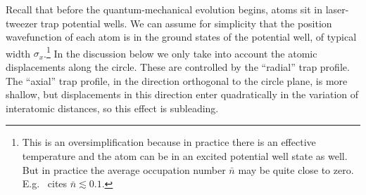 \documentclass[a4paper,12pt]{article}
\theoremstyle{remark}
\theoremstyle{theorem}
\begin{document}
Recall that before the quantum-mechanical evolution begins, atoms sit in laser-tweezer trap potential wells. We can assume for simplicity that the position wavefunction of each atom is in the ground states of the potential well, of typical width $\sigma_x$.\footnote{This is an oversimplification because in practice there is an effective temperature and the atom can be in an excited potential well state as well. But in practice the average occupation number $\bar n$ may be quite close to zero. E.g.~\cite{Fang:2024uyf} cites $\bar n\lesssim 0.1$.} In the discussion below we only take into account the atomic displacements along the circle. These are controlled by the ``radial'' trap profile. The ``axial'' trap profile, in the direction orthogonal to the circle plane, is more shallow, but displacements in this direction enter quadratically in the variation of interatomic distances, so this effect is subleading. 
\end{document}
